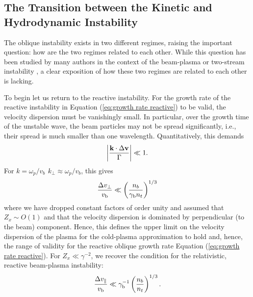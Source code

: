 \documentclass[usenatbib,iop,apj,numberedappendix]{aeb_emulateapj_2015}
\newcommand\ab[1]{{\color{green} \bf #1}} %
\newcommand\ep[1]{{\color{magenta} \bf #1}} %
\newcommand\bmath[1] {\mbox{\boldmath$\rm #1$}}
\newcommand{\vel}{\ensuremath{\bmath{v}}}
\newcommand{\kvec}{\ensuremath{\bmath{k}}}
\newcommand{\gammabeam}{\ensuremath{\gamma_{\rm b}}}
\newcommand{\vbeam}{\ensuremath{v_{\rm b}}}
\begin{document}
\subsection{The Transition between the Kinetic and Hydrodynamic Instability}\label{sec:transition}

The oblique instability exists in two different regimes, raising the important question: how are the two regimes related to each other. While this question has been studied by many authors in the context of the beam-plasma or two-stream instability \citep[see for instance][]{Melrose86,Boyd},  a clear exposition of how these two regimes are related to each other is lacking.  

To begin let us return to the reactive instability.  For the growth rate of the reactive instability in Equation (\ref{eq:growth rate reactive}) to be valid, the velocity dispersion must be vanishingly small. In particular, over the growth time of the unstable wave, the beam particles may not be spread significantly, i.e., their spread is much smaller than one wavelength.  Quantitatively, this demands
\begin{equation}
 \left|\frac{\kvec\cdot\Delta \vel}{\Gamma}\right| \ll 1.
\end{equation}
For \ep{\sout{$k = \omega_p/v_b$} $k_\perp \approx \omega_p/v_b$}, this gives
\begin{equation}\label{eq:oblique reactive regime}
 \frac{\Delta v_{\perp}}{\vbeam} \ll \left(\frac{n_b}{\gammabeam n_t}\right)^{1/3}
\end{equation}
where we have dropped constant factors of order unity and assumed that $Z_x \sim O(1)$ and that the velocity dispersion is dominated by perpendicular (to the beam) component.  Hence, this defines the upper limit on the velocity dispersion of the plasma for the cold-plasma approximation to hold and, hence, the range of validity for the reactive oblique growth rate Equation (\ref{eq:growth rate reactive}).  For $Z_x \ll \gamma^{-2}$, we recover the condition for the relativistic, reactive beam-plasma instability:
\begin{equation}\label{eq:bp reactive regime}
\frac{\Delta v_{\parallel}}{\vbeam} \ll \gammabeam^{-1}\left(\frac{n_b}{n_t}\right)^{1/3}.
\end{equation}
\end{document}
